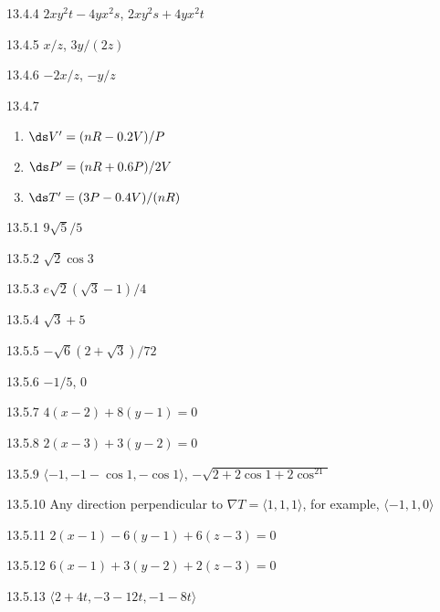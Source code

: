 \begin{Answer}{13.4.4}
$2xy^2t-4yx^2s$, $2xy^2s+4yx^2t$
\end{Answer}
\begin{Answer}{13.4.5}
$x/z$, $3y/(2z)$
\end{Answer}
\begin{Answer}{13.4.6}
$-2x/z$, $-y/z$
\end{Answer}
\begin{Answer}{13.4.7}
\begin{enumerate}
	\item	$\ds V'=(nR-0.2V)/P$
	\item	$\ds P'=(nR+0.6P)/2V$
	\item	$\ds T' = (3P-0.4V)/(nR)$
\end{enumerate}
\end{Answer}
\begin{Answer}{13.5.1}
$9\sqrt5/5$
\end{Answer}
\begin{Answer}{13.5.2}
$\sqrt2\cos3$
\end{Answer}
\begin{Answer}{13.5.3}
$e\sqrt2(\sqrt3-1)/4$
\end{Answer}
\begin{Answer}{13.5.4}
$\sqrt3+5$
\end{Answer}
\begin{Answer}{13.5.5}
$-\sqrt6(2+\sqrt3)/72$
\end{Answer}
\begin{Answer}{13.5.6}
$-1/5$, $0$
\end{Answer}
\begin{Answer}{13.5.7}
$4(x-2)+8(y-1)=0$
\end{Answer}
\begin{Answer}{13.5.8}
$2(x-3)+3(y-2)=0$
\end{Answer}
\begin{Answer}{13.5.9}
$\langle -1,-1-\cos1,-\cos1\rangle$, $-\sqrt{2+2\cos1+2\cos^21}$
\end{Answer}
\begin{Answer}{13.5.10}
Any direction perpendicular to $\nabla T=\langle
1,1,1\rangle$,
for example, $\langle -1,1,0\rangle$
\end{Answer}
\begin{Answer}{13.5.11}
$2(x-1)-6(y-1)+6(z-3)=0$
\end{Answer}
\begin{Answer}{13.5.12}
$6(x-1)+3(y-2)+2(z-3)=0$
\end{Answer}
\begin{Answer}{13.5.13}
$\langle 2+4t,-3-12t,-1-8t\rangle$
\end{Answer}
